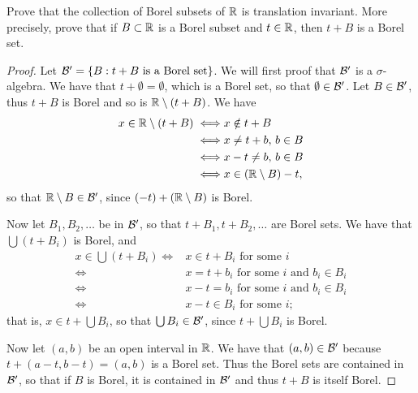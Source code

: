 \begin{exercise}{7}
Prove that the collection of Borel subsets of $\mathbb{R}$ is translation invariant.
More precisely, prove that if $B \subset \mathbb{R}$ is a Borel subset and $t \in \mathbb{R}$, then $t+B$ is a Borel set.
\end{exercise}
\begin{proof}
Let $\mathcal{B}' = \{B: t+B \text{ is a Borel set}\}$.
We will first proof that $\mathcal{B}'$ is a $\sigma$-algebra.
We have that $t+\emptyset = \emptyset$, which is a Borel set, so that $\emptyset \in \mathcal{B}'$.
Let $B\in\mathcal{B}'$, thus $t+B$ is Borel and so is $\mathbb{R} \setminus (t+B)$.
We have
\begin{align*}
    x \in \mathbb{R} \setminus (t+B) 
    \iff& x \notin t+B\\
    \iff& x \neq t+b,\, b \in B\\
    \iff& x-t \neq b,\, b \in B\\
    \iff& x \in (\mathbb{R} \setminus B) - t,
\end{align*}
so that $\mathbb{R} \setminus B \in \mathcal{B}'$, since $(-t) + (\mathbb{R} \setminus B)$ is Borel.

Now let $B_1, B_2, \dots$ be in $\mathcal{B}'$, so that $t+B_1, t+B_2, \dots$ are Borel sets.
We have that $\bigcup (t+B_i)$ is Borel, and 
\begin{align*}
    x \in \bigcup (t+B_i)
    \iff& x \in t + B_i \text{ for some } i\\
    \iff& x = t + b_i \text{ for some } i \text{ and }b_i \in B_i\\
    \iff& x-t = b_i  \text{ for some } i \text{ and }b_i \in B_i\\
    \iff& x-t \in B_i  \text{ for some } i;
\end{align*}
that is, $x \in t+\bigcup B_i$, so that $\bigcup B_i \in \mathcal{B}'$, since $t + \bigcup B_i$ is Borel.

Now let $(a,b)$ be an open interval in $\mathbb{R}$.
We have that $(a,b) \in \mathcal{B}'$ because $t + (a-t, b-t) = (a,b)$ is a Borel set.
Thus the Borel sets are contained in $\mathcal{B}'$, so that if $B$ is Borel, it is contained in $\mathcal{B}'$ and thus $t+B$ is itself Borel.
\end{proof} 

